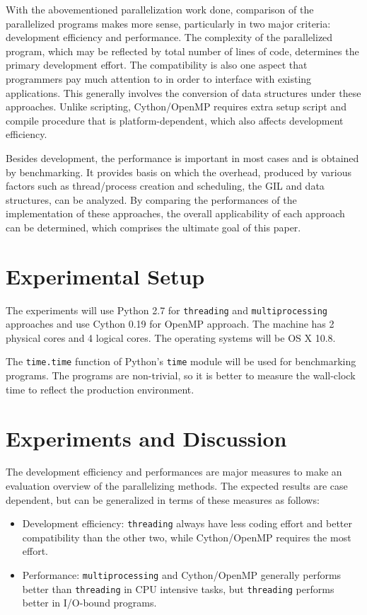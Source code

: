 \documentclass[letterpaper,twocolumn,10pt]{article}
\begin{document}
With the abovementioned parallelization work done, comparison of the parallelized programs makes more sense, particularly in two major criteria: development efficiency and performance. The complexity of the parallelized program, which may be reflected by total number of lines of code, determines the primary development effort. The compatibility is also one aspect that programmers pay much attention to in order to interface with existing applications. This generally involves the conversion of data structures under these approaches. Unlike scripting, Cython/OpenMP requires extra setup script and compile procedure that is platform-dependent, which also affects development efficiency.

Besides development, the performance is important in most cases and is obtained by benchmarking. It provides basis on which the overhead, produced by various factors such as thread/process creation and scheduling, the GIL and data structures, can be analyzed. By comparing the performances of the implementation of these approaches, the overall applicability of each approach can be determined, which comprises the ultimate goal of this paper. 

\section{Experimental Setup}
The experiments will use Python 2.7 for \verb#threading# and \verb#multiprocessing# approaches and use Cython 0.19 for OpenMP approach. The machine has 2 physical cores and 4 logical cores. The operating systems will be OS X 10.8.

The \verb#time.time# function of Python's \verb#time# module will be used for benchmarking programs. The programs are non-trivial, so it is better to measure the wall-clock time to reflect the production environment.

\section{Experiments and Discussion}
The development efficiency and performances are major measures to make an evaluation overview of the parallelizing methods. The expected results are case dependent, but can be generalized in terms of these measures as follows: 
\begin{itemize}
\setlength{\itemsep}{0em}
  \item Development efficiency: \verb#threading# always have less coding effort and better compatibility than the other two, while Cython/OpenMP requires the most effort.
  \item Performance: \verb#multiprocessing# and Cython/OpenMP generally performs better than \verb#threading# in CPU intensive tasks, but \verb#threading# performs better in I/O-bound programs.
\end{itemize}
\end{document}

